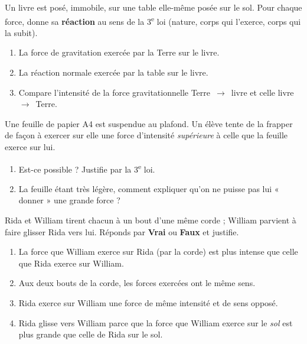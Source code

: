 \documentclass[11pt,a4paper]{article}
\begin{document}

\begin{exo}
Un livre est posé, immobile, sur une table elle-même posée sur le sol. Pour chaque force, donne sa
\textbf{réaction} au sens de la 3\textsuperscript{e} loi (nature, corps qui l'exerce, corps qui la subit).
\begin{enumerate}[label=\alph*)]
  \item La force de gravitation exercée par la Terre sur le livre.
  \item La réaction normale exercée par la table sur le livre.
  \item Compare l'intensité de la force gravitationnelle Terre~$\to$~livre et celle livre~$\to$~Terre.
\end{enumerate}
\end{exo}

\begin{exo}
Une feuille de papier A4 est suspendue au plafond. Un élève tente de la frapper de façon à exercer sur
elle une force d'intensité \emph{supérieure} à celle que la feuille exerce sur lui.
\begin{enumerate}[label=\alph*)]
  \item Est-ce possible ? Justifie par la 3\textsuperscript{e} loi.
  \item La feuille étant très légère, comment expliquer qu'on ne puisse pas lui « donner » une grande force ?
\end{enumerate}
\end{exo}

\begin{exo}
Rida et William tirent chacun à un bout d'une même corde ; William parvient à faire glisser Rida vers
lui. Réponds par \textbf{Vrai} ou \textbf{Faux} et justifie.
\begin{enumerate}[label=\Alph*.]
  \item La force que William exerce sur Rida (par la corde) est plus intense que celle que Rida exerce sur William.
  \item Aux deux bouts de la corde, les forces exercées ont le même sens.
  \item Rida exerce sur William une force de même intensité et de sens opposé.
  \item Rida glisse vers William parce que la force que William exerce sur le \emph{sol} est plus grande que celle de Rida sur le sol.
\end{enumerate}
\end{exo}
\end{document}
